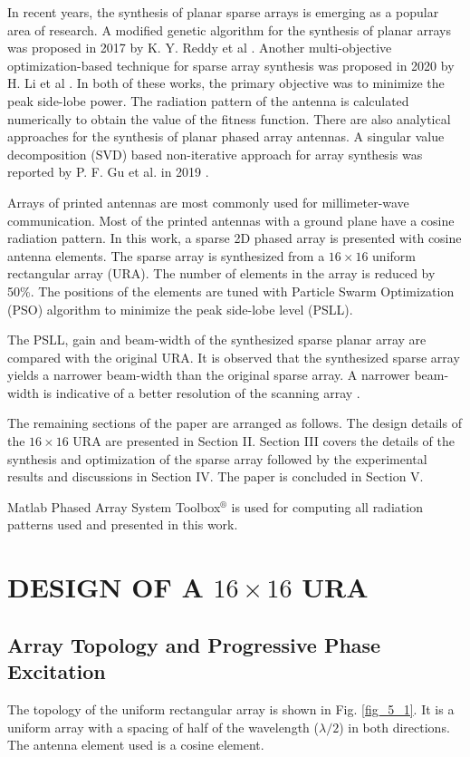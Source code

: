 In recent years, the synthesis of planar sparse arrays is emerging as a popular area of research. A modified genetic algorithm for the synthesis of planar arrays was proposed in 2017 by K. Y. Reddy et al \cite{randomlySpacedArray}. Another multi-objective optimization-based technique for sparse array synthesis was proposed in 2020 by H. Li et al \cite{selfOrgOpt}. In both of these works, the primary objective was to minimize the peak side-lobe power. The radiation pattern of the antenna is calculated numerically to obtain the value of the fitness function. There are also analytical approaches for the synthesis of planar phased array antennas. A singular value decomposition (SVD) based non-iterative approach for array synthesis was reported by P. F. Gu et al. in 2019 \cite{SyntLargeSparse}.

Arrays of printed antennas are most commonly used for millimeter-wave communication. Most of the printed antennas with a ground plane have a cosine radiation pattern. In this work, a sparse 2D phased array is presented with cosine antenna elements. The sparse array is synthesized from a $16\times 16$ uniform rectangular array (URA). The number of elements in the array is reduced by 50\%. The positions of the elements are tuned with Particle Swarm Optimization (PSO) algorithm to minimize the peak side-lobe level (PSLL).

The PSLL, gain and beam-width of the synthesized sparse planar array are compared with the original URA. It is observed that the synthesized sparse array yields a narrower beam-width than the original sparse array. A narrower beam-width is indicative of a better resolution of the scanning array \cite{sparseDesignConstraints}.

The remaining sections of the paper are arranged as follows. The design details of the $16\times16$ URA are presented in Section II. Section III covers the details of the synthesis and optimization of the sparse array followed by the experimental results and discussions in Section IV. The paper is concluded in Section V.

Matlab Phased Array System Toolbox$^{\circledR}$ is used for computing all radiation patterns used and presented in this work.

\section{DESIGN OF A $16\times16$ URA}\label{c5sec_design}
\subsection{Array Topology and Progressive Phase Excitation}
The topology of the uniform rectangular array is shown in Fig. \ref{fig_5_1}. It is a uniform array with a spacing of half of the wavelength ($\lambda/2$) in both directions. The antenna element used is a cosine element.

